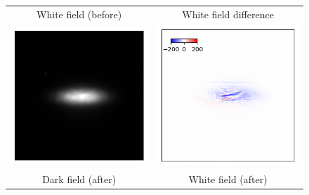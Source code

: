 \documentclass[12pt]{scrartcl}
\newcommand{\myscale}{1}
\begin{document}
\renewcommand{\myscale}{0.8}
\begin{figure}
\centering
\begin{tabular}{cc}
	 White field (before)
&  White field difference
\\
  \includegraphics[scale=\myscale]{whiteField_pre} 
& \includegraphics[scale=\myscale]{whiteField_diff}
\\
	Dark field (after)
& White field (after)
\\

\end{tabular}
\end{figure}
\end{document}
